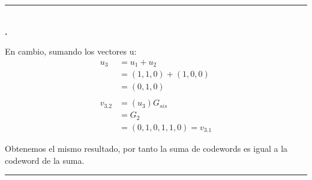 \documentclass[11pt,fleqn]{article}
\begin{document}
\begin{enumerate}[label=\alph*)]
\rule{4cm}{0.4pt}\\\textbf{\textbar {}.}

En cambio, sumando los vectores u:
\begin{align*}
u_3
&=u_1+u_2\\
&=(1,1,0)+(1,0,0)\\
&=(0,1,0)\\ \\
v_{3.2}
&=(u_3)G_{sis}\\
&=G_2\\
&=(0,1,0,1,1,0)=v_{3.1}
\end{align*}

Obtenemos el mismo resultado, por tanto la suma de codewords es igual a la codeword de la suma.

\end{enumerate}

\vspace{1em}
\hrule
\vspace{1em}



\end{document}
